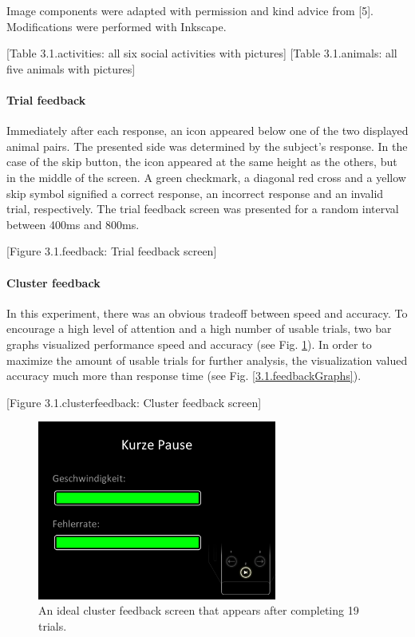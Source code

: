 Image components were adapted with permission and kind advice from [5].
Modifications were performed with Inkscape.

[Table 3.1.activities: all six social activities with pictures]
[Table 3.1.animals: all five animals with pictures]

\paragraph{Trial feedback}
Immediately after each response, an icon appeared below one of the two displayed animal pairs.
The presented side was determined by the subject's response.
In the case of the skip button, the icon appeared at the same height as the others, but in the middle of the screen.
A green checkmark, a diagonal red cross and a yellow skip symbol signified a correct response, an incorrect response and an invalid trial, respectively.
The trial feedback screen was presented for a random interval between 400ms and 800ms.

[Figure 3.1.feedback: Trial feedback screen]

\paragraph{Cluster feedback}
In this experiment, there was an obvious tradeoff between speed and accuracy.
To encourage a high level of attention and a high number of usable trials, two bar graphs visualized performance speed and accuracy (see Fig. \ref{3.1.clusterfeedback}).
In order to maximize the amount of usable trials for further analysis, the visualization valued accuracy much more than response time (see Fig. \ref{3.1.feedbackGraphs}).

[Figure 3.1.clusterfeedback: Cluster feedback screen]
\begin{figure}[h]
\begin{center}
\vspace{7mm}
\includegraphics[width=0.7\textwidth]{pics/3_1_clusterfeedback}
\caption{\label{3.1.clusterfeedback} An ideal cluster feedback screen that appears after completing 19 trials.}
\end{center}
\end{figure}

